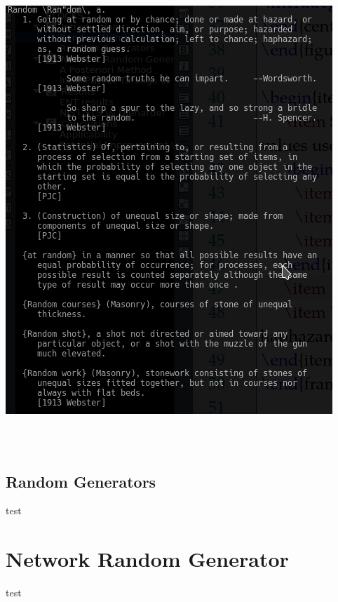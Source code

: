 \documentclass{beamer}
\begin{document}
\begin{frame}


\begin{columns}

\begin{column}{0.5\textwidth}

\includegraphics[scale = 0.5]{images/random-def.png}
\end{column}

\begin{column}{0.5\textwidth}
\end{column}

\end{columns}

\end{frame}


\

\subsection{Random Generators}
\begin{frame}
test
\end{frame}
\section{Network Random Generator}
\begin{frame}
\end{frame}
\begin{frame}
test
\end{frame}
\end{document}
